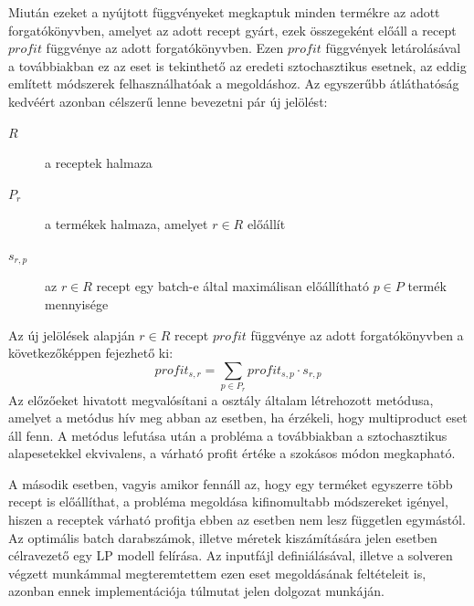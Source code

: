 Miután ezeket a nyújtott függvényeket megkaptuk minden termékre az adott forgatókönyvben, amelyet az adott recept gyárt, ezek összegeként előáll a recept $profit$ függvénye az adott forgatókönyvben.
Ezen $profit$ függvények letárolásával a továbbiakban ez az eset is tekinthető az eredeti sztochasztikus esetnek, az eddig említett módszerek felhasználhatóak a megoldáshoz.
Az egyszerűbb átláthatóság kedvéért azonban célszerű lenne bevezetni pár új jelölést:
\begin{description}
\item[$R$] a receptek halmaza
\item[$P_r$] a termékek halmaza, amelyet $r \in R$ előállít
\item[$s_{r,p}$] az $r \in R$ recept egy batch-e által maximálisan előállítható $p \in P$ termék mennyisége
\end{description}
Az új jelölések alapján $r \in R$ recept $profit$ függvénye az adott forgatókönyvben a következőképpen fejezhető ki:
$$profit_{s,r}=\sum_{p \in P_r} profit_{s,p} \cdot s_{r,p}$$ 
Az előzőeket hivatott megvalósítani a  osztály általam létrehozott  metódusa, amelyet a  metódus hív meg abban az esetben, ha érzékeli, hogy multiproduct eset áll fenn.
A metódus lefutása után a probléma a továbbiakban a sztochasztikus alapesetekkel ekvivalens, a várható profit értéke a szokásos módon megkapható.

A második esetben, vagyis amikor fennáll az, hogy egy terméket egyszerre több recept is előállíthat, a probléma megoldása kifinomultabb módszereket igényel, hiszen a receptek várható profitja ebben az esetben nem lesz független egymástól.
Az optimális batch darabszámok, illetve méretek kiszámítására jelen esetben célravezető egy LP modell felírása. \cite{phd_Hegyhati} Az inputfájl definiálásával, illetve a solveren végzett munkámmal megteremtettem ezen eset megoldásának feltételeit is, azonban ennek implementációja túlmutat jelen dolgozat munkáján.
